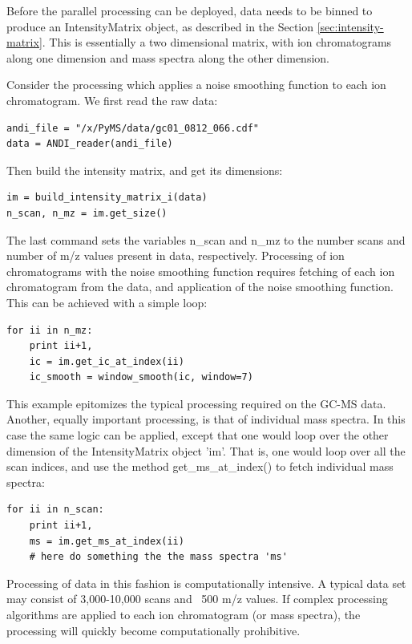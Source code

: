 Before the parallel processing can be deployed, data needs to be binned
to produce an IntensityMatrix object, as described in the Section
\ref{sec:intensity-matrix}. This is essentially a two dimensional
matrix, with ion chromatograms along one dimension and mass spectra
along the other dimension.

Consider the processing which applies a noise smoothing function to
each ion chromatogram. We first read the raw data:

\begin{verbatim}
andi_file = "/x/PyMS/data/gc01_0812_066.cdf"
data = ANDI_reader(andi_file)
\end{verbatim}
 
Then build the intensity matrix, and get its dimensions:

\begin{verbatim}
im = build_intensity_matrix_i(data)
n_scan, n_mz = im.get_size()
\end{verbatim}

The last command sets the variables n\_scan and n\_mz to the number
scans and number of m/z values present in data, respectively.
Processing of ion chromatograms with the noise smoothing function
requires fetching of each ion chromatogram from the data, and
application of the noise smoothing function. This can be achieved 
with a simple loop: 

\begin{verbatim}
for ii in n_mz:
    print ii+1,
    ic = im.get_ic_at_index(ii)
    ic_smooth = window_smooth(ic, window=7)
\end{verbatim}

This example epitomizes the typical processing required on the
GC-MS data. Another, equally important processing, is that of
individual mass spectra. In this case the same logic can be
applied, except that one would loop over the other dimension
of the IntensityMatrix object 'im'. That is, one would loop
over all the scan indices, and use the method 
get\_ms\_at\_index() to fetch individual mass spectra:


\begin{verbatim}
for ii in n_scan:
    print ii+1,
    ms = im.get_ms_at_index(ii)
    # here do something the the mass spectra 'ms'
\end{verbatim}

Processing of data in this fashion is computationally intensive.
A typical data set may consist of 3,000-10,000 scans and ~500
m/z values. If complex processing algorithms are applied to
each ion chromatogram (or mass spectra), the processing will
quickly become computationally prohibitive.

